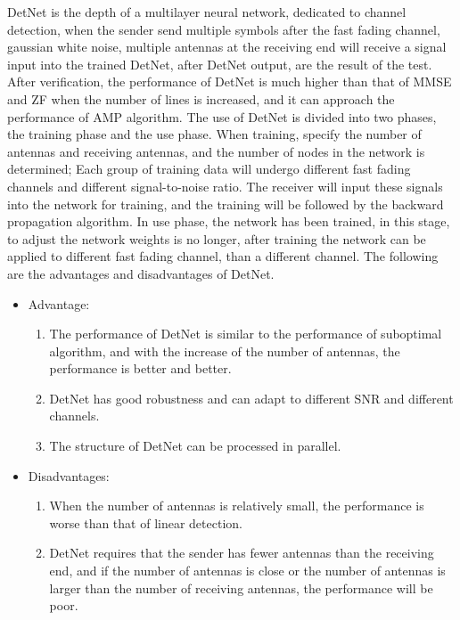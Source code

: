 \documentclass[conference]{IEEEtran}
\begin{document}
DetNet is the depth of a multilayer neural network, dedicated to channel detection, when the sender send multiple symbols after the fast fading channel, gaussian white noise, multiple antennas at the receiving end will receive a signal input into the trained DetNet, after DetNet output, are the result of the test. After verification, the performance of DetNet is much higher than that of MMSE and ZF when the number of lines is increased, and it can approach the performance of AMP algorithm. The use of DetNet is divided into two phases, the training phase and the use phase. When training, specify the number of antennas and receiving antennas, and the number of nodes in the network is determined; Each group of training data will undergo different fast fading channels and different signal-to-noise ratio. The receiver will input these signals into the network for training, and the training will be followed by the backward propagation algorithm. In use phase, the network has been trained, in this stage, to adjust the network weights is no longer, after training the network can be applied to different fast fading channel, than a different channel. The following are the advantages and disadvantages of DetNet.
\begin{itemize}
\item Advantage:
    \begin{enumerate}
        \item  The performance of DetNet is similar to the performance of suboptimal algorithm, and with the increase of the number of antennas, the performance is better and better.
        \item  DetNet has good robustness and can adapt to different SNR and different channels.
        \item  The structure of DetNet can be processed in parallel.
    \end{enumerate}
\item Disadvantages:
    \begin{enumerate}
        \item  When the number of antennas is relatively small, the performance is worse than that of linear detection.
        \item  DetNet requires that the sender has fewer antennas than the receiving end, and if the number of antennas is close or the number of antennas is larger than the number of receiving antennas, the performance will be poor.
    \end{enumerate}
\end{itemize}
\end{document}
